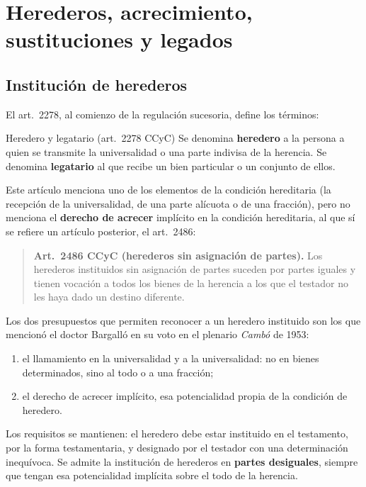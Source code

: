 \documentclass[12pt,oneside]{book}
\begin{document}
\chapter[Herederos, acrecimiento, sustituciones y legados]{Herederos, acrecimiento, sustituciones y legados}

\section{Institución de herederos}

El art.~2278, al comienzo de la regulación sucesoria, define los términos:

\begin{definition}{Heredero y legatario (art.~2278 CCyC)}
Se denomina \textbf{heredero} a la persona a quien se transmite la universalidad o una parte indivisa de la herencia. Se denomina \textbf{legatario} al que recibe un bien particular o un conjunto de ellos.
\end{definition}

Este artículo menciona uno de los elementos de la condición hereditaria (la recepción de la universalidad, de una parte alícuota o de una fracción), pero no menciona el \textbf{derecho de acrecer} implícito en la condición hereditaria, al que sí se refiere un artículo posterior, el art.~2486:

\begin{quote}
\textbf{Art.~2486 CCyC (herederos sin asignación de partes).} Los herederos instituidos sin asignación de partes suceden por partes iguales y tienen vocación a todos los bienes de la herencia a los que el testador no les haya dado un destino diferente.
\end{quote}

Los dos presupuestos que permiten reconocer a un heredero instituido son los que mencionó el doctor Bargalló en su voto en el plenario \emph{Cambó} de 1953:

\begin{enumerate}
    \item el llamamiento en la universalidad y a la universalidad: no en bienes determinados, sino al todo o a una fracción;
    \item el derecho de acrecer implícito, esa potencialidad propia de la condición de heredero.
\end{enumerate}

Los requisitos se mantienen: el heredero debe estar instituido en el testamento, por la forma testamentaria, y designado por el testador con una determinación inequívoca. Se admite la institución de herederos en \textbf{partes desiguales}, siempre que tengan esa potencialidad implícita sobre el todo de la herencia.
\end{document}
